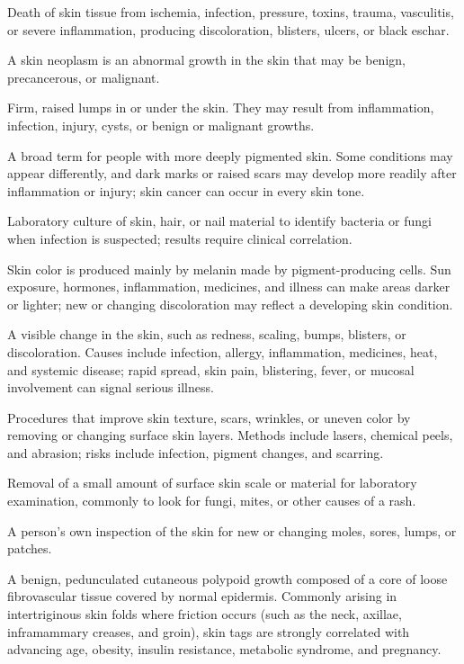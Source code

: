  Death of skin tissue from ischemia, infection, pressure, toxins, trauma, vasculitis, or severe inflammation, producing discoloration, blisters, ulcers, or black eschar.

 A skin neoplasm is an abnormal growth in the skin that may be benign, precancerous, or malignant.

 Firm, raised lumps in or under the skin. They may result from inflammation, infection, injury, cysts, or benign or malignant growths.

 A broad term for people with more deeply pigmented skin. Some conditions may appear differently, and dark marks or raised scars may develop more readily after inflammation or injury; skin cancer can occur in every skin tone.

 Laboratory culture of skin, hair, or nail material to identify bacteria or fungi when infection is suspected; results require clinical correlation.

 Skin color is produced mainly by melanin made by pigment-producing cells. Sun exposure, hormones, inflammation, medicines, and illness can make areas darker or lighter; new or changing discoloration may reflect a developing skin condition.

 A visible change in the skin, such as redness, scaling, bumps, blisters, or discoloration. Causes include infection, allergy, inflammation, medicines, heat, and systemic disease; rapid spread, skin pain, blistering, fever, or mucosal involvement can signal serious illness.

 Procedures that improve skin texture, scars, wrinkles, or uneven color by removing or changing surface skin layers. Methods include lasers, chemical peels, and abrasion; risks include infection, pigment changes, and scarring.

 Removal of a small amount of surface skin scale or material for laboratory examination, commonly to look for fungi, mites, or other causes of a rash.

 A person's own inspection of the skin for new or changing moles, sores, lumps, or patches.

 A benign, pedunculated cutaneous polypoid growth composed of a core of loose fibrovascular tissue covered by normal epidermis. Commonly arising in intertriginous skin folds where friction occurs (such as the neck, axillae, inframammary creases, and groin), skin tags are strongly correlated with advancing age, obesity, insulin resistance, metabolic syndrome, and pregnancy.

